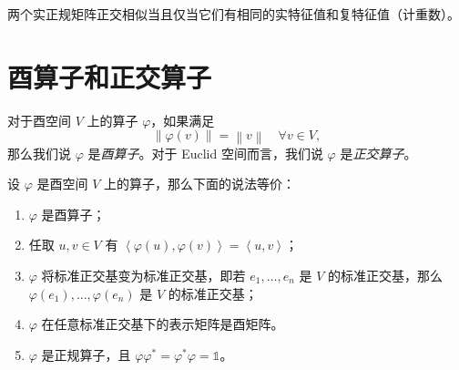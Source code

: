 \documentclass[fontset=none,zihao=-4]{Notes}
\newcommand{\inn}[1]{\left\langle#1\right\rangle}
\newcommand{\norm}[1]{\left\lVert#1\right\rVert}
\begin{document}
\begin{corollary}
  两个实正规矩阵正交相似当且仅当它们有相同的实特征值和复特征值（计重数）。
\end{corollary}

\section{酉算子和正交算子}

对于酉空间 $V$ 上的算子 $\varphi$，如果满足
\[
  \norm{\varphi(v)}=\norm{v}\quad \forall v\in V,  
\]
那么我们说 $\varphi$ 是\emph{酉算子}。对于 Euclid 空间而言，我们说
$\varphi$ 是\emph{正交算子}。

\begin{proposition}
  设 $\varphi$ 是酉空间 $V$ 上的算子，那么下面的说法等价：
  \begin{enumerate}
    \item $\varphi$ 是酉算子；
    \item 任取 $u,v\in V$ 有 $\inn{\varphi(u),\varphi(v)}=\inn{u,v}$；
    \item $\varphi$ 将标准正交基变为标准正交基，即若 $e_1,\dots,e_n$
    是 $V$ 的标准正交基，那么 $\varphi(e_1),\dots,\varphi(e_n)$ 是 $V$ 的标准正交基；
    \item $\varphi$ 在任意标准正交基下的表示矩阵是酉矩阵。
    \item $\varphi$ 是正规算子，且 $\varphi\varphi^*=\varphi^*\varphi=\mathbb{1}$。
  \end{enumerate}
\end{proposition}
\end{document}
